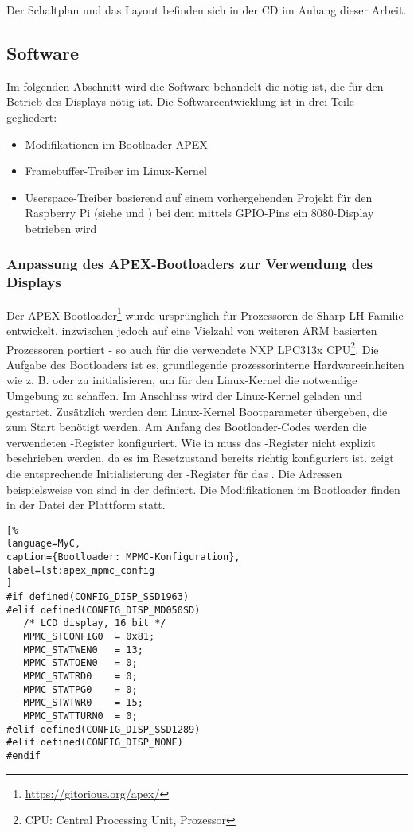Der Schaltplan und das Layout befinden sich in der CD im Anhang dieser Arbeit.
\newpage
\subsection{Software}
Im folgenden Abschnitt wird die Software behandelt die nötig ist, die für den Betrieb des Displays nötig ist.
Die Softwareentwicklung ist in drei Teile gegliedert:
\begin{itemize}
\item Modifikationen im Bootloader APEX
\item Framebuffer-Treiber im Linux-Kernel
\item Userspace-Treiber basierend auf einem vorhergehenden Projekt für den Raspberry Pi (siehe \cite{Schlegel2013a} und \cite{Schlegel2013b}) bei dem mittels GPIO-Pins ein 8080-Display betrieben wird
\end{itemize}

\subsubsection{Anpassung des APEX-Bootloaders zur Verwendung des Displays}
Der APEX-Bootloader\footnote{\url{https://gitorious.org/apex/}} wurde ursprünglich für Prozessoren de Sharp LH Familie entwickelt, inzwischen jedoch auf eine Vielzahl von weiteren ARM basierten Prozessoren portiert - so auch für die verwendete NXP LPC313x CPU\footnote{CPU: Central Processing Unit, Prozessor}.
Die Aufgabe des Bootloaders ist es, grundlegende prozessorinterne Hardwareeinheiten wie z. B.  oder  zu initialisieren, um für den Linux-Kernel die notwendige Umgebung zu schaffen. Im Anschluss wird der Linux-Kernel geladen und gestartet. Zusätzlich werden dem Linux-Kernel Bootparameter übergeben, die zum Start benötigt werden. Am Anfang des Bootloader-Codes werden die verwendeten -Register konfiguriert. Wie in  muss das -Register  nicht explizit beschrieben werden, da es im Resetzustand bereits richtig konfiguriert ist.  zeigt die entsprechende Initialisierung der -Register für das . Die Adressen beispielsweise von  sind in der  definiert. Die Modifikationen im Bootloader finden in der Datei  der Plattform statt.

\begin{lstlisting}[%
language=MyC,
caption={Bootloader: MPMC-Konfiguration},
label=lst:apex_mpmc_config
]
#if defined(CONFIG_DISP_SSD1963)
#elif defined(CONFIG_DISP_MD050SD)
   /* LCD display, 16 bit */
   MPMC_STCONFIG0  = 0x81;
   MPMC_STWTWEN0   = 13;
   MPMC_STWTOEN0   = 0;
   MPMC_STWTRD0    = 0;
   MPMC_STWTPG0    = 0;
   MPMC_STWTWR0    = 15;
   MPMC_STWTTURN0  = 0;
#elif defined(CONFIG_DISP_SSD1289)
#elif defined(CONFIG_DISP_NONE)
#endif
\end{lstlisting}


